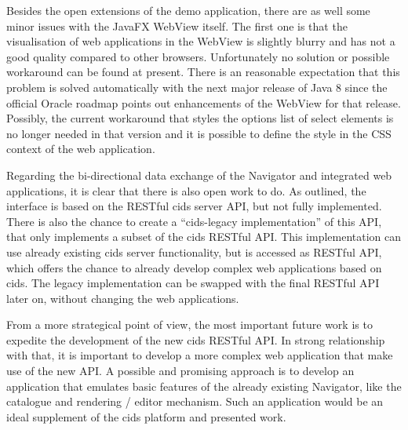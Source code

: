 Besides the open extensions of the demo application, there are as well some minor issues with the JavaFX WebView itself. 
The first one is that the visualisation of web applications in the WebView is slightly blurry and has not a good quality compared to other browsers. 
Unfortunately no solution or possible workaround can be found at present. There is an reasonable expectation that this problem is solved automatically with the next major release of Java 8 since the official Oracle roadmap points out enhancements of the WebView for that release. 
Possibly, the current workaround that styles the options list of select elements is no longer needed in that version and it is possible to define the style in the CSS context of the web application.
   
Regarding the bi-directional data exchange of the Navigator and integrated web applications, it is clear that there is also open work to do. 
As outlined, the interface is based on the RESTful cids server API, but not fully implemented. 
There is also the chance to create a \enquote{cids-legacy implementation} of this API, that only implements a subset of the cids RESTful API. 
This implementation can use already existing cids server functionality, but is accessed as RESTful API, which offers the chance to already develop complex web applications based on cids. 
The legacy implementation can be swapped with the final RESTful API later on, without changing the web applications.

From a more strategical point of view, the most important future work is to expedite the development of the new cids RESTful API. 
In strong relationship with that, it is important to develop a more complex web application that make use of the new API. 
A possible and promising approach is to develop an application that emulates basic features of the already existing Navigator, like the catalogue and rendering / editor mechanism. 
Such an application would be an ideal supplement of the cids platform and presented work.
 
